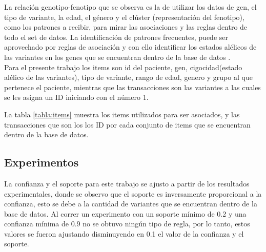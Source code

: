 La relación genotipo-fenotipo que se observa es  la de utilizar los datos de gen, el tipo de variante, la edad, el género y el clúster (representación del fenotipo), como los patrones a recibir, para mirar las asociaciones y las reglas dentro de todo el set de datos. La identificación de patrones frecuentes, puede ser aprovechado por reglas de asociación y con ello identificar los estados alélicos de las variantes en los genes que se encuentran dentro de la base de datos \cite{breuler2017}.\\

Para el presente trabajo los items son id del paciente, gen, cigocidad(estado alélico de las variantes), tipo de variante, rango de edad, genero y grupo al que pertenece el paciente, mientras que las transacciones son las variantes a las cuales se les asigna un ID iniciando con el número 1.

\begin{table}[H]
	\centering
\caption{ Tabla de items y transacciones}
\label{tabla:items}
\end{table}
 
La tabla \ref{tabla:items} muestra los items utilizados para ser asociados, y las transacciones que son los los ID por cada conjunto de items que se encuentran dentro de la base de datos.

\subsection{Experimentos}

La confianza y el soporte para este trabajo se ajusto a partir de los resultados experimentales, donde se observo que el soporte es inversamente proporcional a la confianza, esto se debe a la cantidad de variantes que se encuentran dentro de la base de datos. Al correr un experimento con un soporte mínimo de 0.2 y una confianza mínima de 0.9 no se obtuvo ningún tipo de regla, por lo tanto, estos valores se fueron ajustando disminuyendo en 0.1 el valor de la confianza y el soporte.\\

